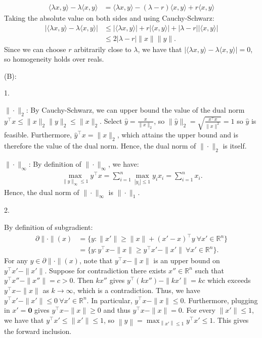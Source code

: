 \documentclass[11pt,letterpaper]{article}
\theoremstyle{definition}
\newcommand{\reals}{\mathbb{R}}
\begin{document}
\begin{enumerate}
    \begin{align}
        \langle \lambda x,y\rangle - \lambda\langle x,y\rangle &= \langle \lambda x,y\rangle - (\lambda-r)\langle x,y\rangle + r\langle x,y\rangle
    \end{align}
    Taking the absolute value on both sides and using Cauchy-Schwarz:
    \begin{align*}
        |\langle \lambda x,y\rangle - \lambda\langle x,y\rangle | &\leq |\langle \lambda x,y\rangle| + r|\langle x,y\rangle| + |\lambda-r||\langle x,y\rangle|\\
        & \leq 2|\lambda-r| \|x\| \|y\|.
    \end{align*}
    Since we can choose $r$ arbitrarily close to $\lambda$, we have that $|\langle \lambda x,y\rangle - \lambda\langle x,y\rangle |=0$, so homogeneity holds over reals.
\end{enumerate}

(B):

1.

$\|\cdot\|_2$:
By Cauchy-Schwarz, we can upper bound the value of the dual norm $y^\top x\leq \|x\|_2\|y\|_2\leq \|x\|_2$. 
Select $\hat{y}=\frac{x}{\|x\|_2}$, so $\|\hat{y}\|_2 = \sqrt{\frac{x^\top x}{\|x\|^2}} = 1$ so $\hat{y}$ is feasible. 
Furthermore, $\hat{y}^\top x = \|x\|_2$, which attains the upper bound and is therefore the value of the dual norm.
Hence, the dual norm of $\|\cdot\|_2$ is itself.

$\|\cdot\|_\infty$:
By definition of $\|\cdot\|_\infty$, we have:
\begin{align*}
    \max_{\|y\|_\infty\leq 1} y^\top x  = \sum_{i=1}^n\max_{|y_i|\leq 1} y_i x_i = \sum_{i=1}^n x_i.
\end{align*}
Hence, the dual norm of $\|\cdot\|_\infty$ is $\|\cdot\|_1$.

2.

By definition of subgradient:
\begin{align*}
    \partial\|\cdot \|(x) &= \{y:\|x'\|\geq\|x\| + (x'-x)^\top y\ \forall x'\in \reals^n\} \\
    &= \{y: y^\top x - \|x\|\geq y^\top x' - \| x'\|\ \forall x'\in \reals^n\}.
\end{align*}
For any $y\in \partial\|\cdot \|(x)$, note that $y^\top x - \|x\|$ is an upper bound on $y^\top x' - \| x'\|$. 
Suppose for contradiction there exists $x''\in \reals^n$ such that $y^\top x'' - \| x''\| = c>0$. 
Then $kx''$ gives $y^\top (kx'') - \| kx'\| = kc$ which exceeds $y^\top x - \|x\|$ as $k\to \infty$, which is a contradiction.
Thus, we have $y^\top x' - \| x'\|\leq 0 \ \forall x'\in \reals^n$.
In particular, $y^\top x - \| x\| \leq 0$. 
Furthermore, plugging in $x' = \mathbf{0}$ gives $y^\top x - \| x\| \geq 0$ and thus $y^\top x - \| x\| = 0$.
For every $\|x'\|\leq 1$, we have that $y^\top x'\leq \| x'\|\leq 1$, so $\left\|y\right\| = \max_{\left\|x'\right\|\leq 1}y^\top x'\leq 1$.
This gives the forward inclusion.
\end{document}
